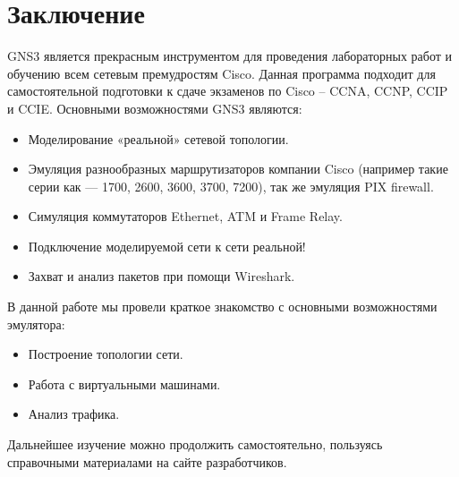 \documentclass[a4paper, 12pt]{article}		%
\begin{document}

\tableofcontents










\newpage
\section*{Заключение}

GNS3 является прекрасным инструментом для проведения лабораторных работ и обучению всем сетевым премудростям Cisco. Данная программа подходит для самостоятельной подготовки к сдаче экзаменов по Cisco -- CCNA, CCNP, CCIP и CCIE. Основными возможностями GNS3 являются:
\begin{itemize}
\item Моделирование «реальной» сетевой топологии.
\item Эмуляция разнообразных маршрутизаторов компании Cisco (например такие серии как — 1700, 2600, 3600, 3700, 7200), так же эмуляция PIX firewall.
\item Симуляция коммутаторов Ethernet, ATM и Frame Relay.
\item Подключение моделируемой сети к сети реальной!
\item Захват и анализ пакетов при помощи Wireshark.
\end{itemize}

В данной работе мы провели краткое знакомство с основными возможностями эмулятора:
\begin{itemize}
\item Построение топологии сети.
\item Работа с виртуальными машинами.
\item Анализ трафика.
\end{itemize}

Дальнейшее изучение можно продолжить самостоятельно, пользуясь справочными материалами на сайте разработчиков.

\end{document}

